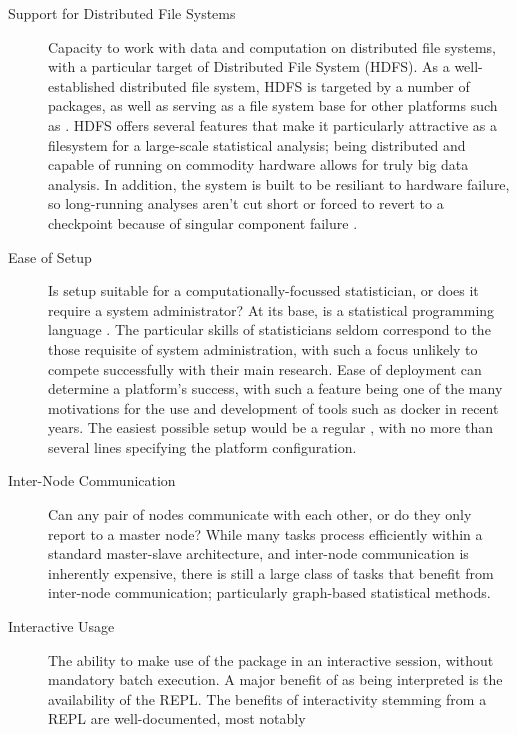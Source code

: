 \begin{description}
  \item[Support for Distributed File Systems]
    Capacity to work with data and computation on distributed file systems,
    with a particular target of  Distributed File System (HDFS). As a
    well-established distributed file system, HDFS is targeted by a number
    of \R packages, as well as serving as a file system base for other
    platforms such as  \cite{analytics:_rhadoop_wiki}
    \cite{deltarho:_rhipe}\cite{urbanek20}\cite{zaharia2016apache}. HDFS offers
    several features that make it particularly attractive as a filesystem
    for a large-scale statistical analysis; being distributed and capable of
    running on commodity hardware allows for truly big data analysis. In
    addition, the system is built to be resiliant to hardware failure, so
    long-running analyses aren't cut short or forced to revert to a
    checkpoint because of singular component failure
    \cite{shvachko2010hadoop}.
  \item[Ease of Setup]
    Is setup suitable for a computationally-focussed statistician, or does
    it require a system administrator? At its base, \R is a statistical
    programming language \cite{rcore2020intro}. The particular skills of
    statisticians seldom correspond to the those requisite of system
    administration, with such a focus unlikely to compete successfully with
    their main research. Ease of deployment can determine a platform's
    success, with such a feature being one of the many motivations for the
    use and development of tools such as docker in recent years. The easiest
    possible setup would be a regular
    , with no more than
    several lines specifying the platform configuration.
  \item[Inter-Node Communication]
    Can any pair of nodes communicate with each other, or do they only
    report to a master node? While many tasks process efficiently within a
    standard master-slave architecture, and inter-node communication is
    inherently expensive, there is still a large class of tasks that benefit
    from inter-node communication\cite{walker1996mpi}; particularly
    graph-based statistical methods.
  \item[Interactive Usage]
    The ability to make use of the package in an interactive \R session,
    without mandatory batch execution. A major benefit of \R as being
    interpreted is the availability of the REPL. The benefits of
    interactivity stemming from a REPL are well-documented, most notably

\end{description}
